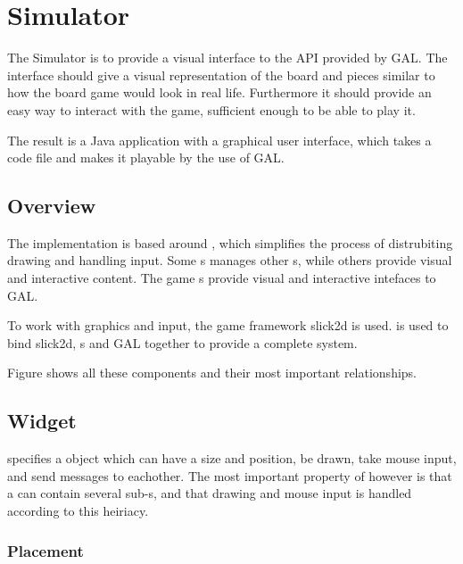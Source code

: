 \section{Simulator}

The Simulator is to provide a visual interface to the API provided by GAL. The
interface should give a visual representation of the board and pieces similar to
how the board game would look in real life. Furthermore it should provide an
easy way to interact with the game, sufficient enough to be able to play it.

The result is a Java application with a graphical user interface, which takes a
\productname code file and makes it playable by the use of GAL.


\subsection{Overview}

The implementation is based around , which simplifies the
process of distrubiting drawing and handling input. Some s
manages other s, while others provide visual and interactive
content. The game s provide visual and interactive intefaces to
GAL.

To work with graphics and input, the game framework slick2d is used.
 is used to bind slick2d, s and GAL
together to provide a complete system.

Figure  shows all these components and their most
important relationships.


\subsection{Widget}

 specifies a object which can have a size and position, be
drawn, take mouse input, and send messages to eachother. The most important
property of  however is that a  can contain
several sub-s, and that drawing and mouse input is handled
according to this heiriacy.

\subsubsection{Placement}

